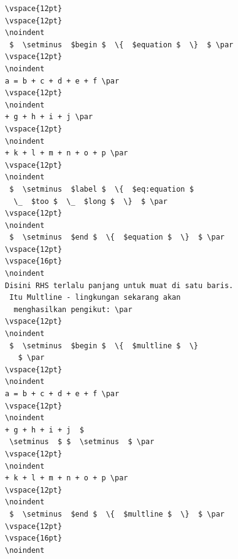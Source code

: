  \begin{verbatim}
\vspace{12pt}
\vspace{12pt}
\noindent 
 $  \setminus  $begin $  \{  $equation $  \}  $ \par
\vspace{12pt}
\noindent 
a = b + c + d + e + f \par
\vspace{12pt}
\noindent 
+ g + h + i + j \par
\vspace{12pt}
\noindent 
+ k + l + m + n + o + p \par
\vspace{12pt}
\noindent 
 $  \setminus  $label $  \{  $eq:equation $ 
  \_  $too $  \_  $long $  \}  $ \par
\vspace{12pt}
\noindent 
 $  \setminus  $end $  \{  $equation $  \}  $ \par
\vspace{12pt}
\vspace{16pt}
\noindent 
Disini RHS terlalu panjang untuk muat di satu baris.
 Itu Multline - lingkungan sekarang akan
  menghasilkan pengikut: \par
\vspace{12pt}
\noindent 
 $  \setminus  $begin $  \{  $multline $  \}
   $ \par
\vspace{12pt}
\noindent 
a = b + c + d + e + f \par
\vspace{12pt}
\noindent 
+ g + h + i + j  $ 
 \setminus  $ $  \setminus  $ \par
\vspace{12pt}
\noindent 
+ k + l + m + n + o + p \par
\vspace{12pt}
\noindent 
 $  \setminus  $end $  \{  $multline $  \}  $ \par
\vspace{12pt}
\vspace{16pt}
\noindent 

\end{verbatim}

